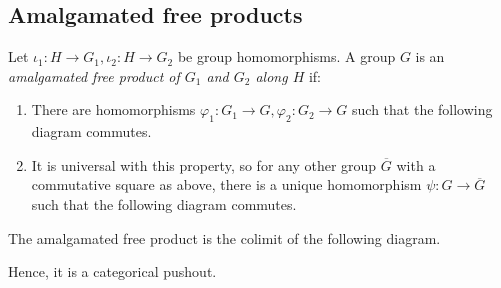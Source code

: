 \subsection{Amalgamated free products}
\begin{definition}
	Let \( \iota_1 \colon H \to G_1, \iota_2 \colon H \to G_2 \) be group homomorphisms.
	A group \( G \) is an \emph{amalgamated free product of \( G_1 \) and \( G_2 \) along \( H \)} if:
	\begin{enumerate}
		\item There are homomorphisms \( \varphi_1 \colon G_1 \to G, \varphi_2 \colon G_2 \to G \) such that the following diagram commutes.
		\begin{center}
		\end{center}
		\item It is universal with this property, so for any other group \( \overline G \) with a commutative square as above, there is a unique homomorphism \( \psi \colon G \to \overline G \) such that the following diagram commutes.
		\begin{center}
		\end{center}
	\end{enumerate}
\end{definition}
\begin{remark}
	The amalgamated free product is the colimit of the following diagram.
	\begin{center}
	\end{center}
	Hence, it is a categorical pushout.
\end{remark}
